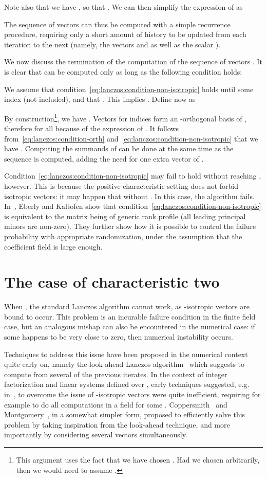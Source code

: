 Note also that we have ,
so that . We can
then simplify the expression of  as


The sequence of vectors  can thus be computed
with a simple recurrence procedure, requiring only a short amount of
history to be updated from each iteration to the next (namely, the
vectors  and  as well as the scalar ). 

We now discuss the termination of the computation of the sequence of
vectors . It is clear that  can be computed only
as long as the following condition holds:

We assume
that condition~\eqref{eq:lanczos:condition-non-isotropic} holds until
some index  (not included), and that . This implies
. Define now  as

By construction\footnote{This argument uses the fact that we have chosen
. Had we chosen  arbitrarily, then we would need to assume
.}, we have . Vectors  for indices 
form an -orthogonal basis of , therefore  for all
 because of the expression of . It follows from~\eqref{eq:lanczos:condition-orth}
and~\eqref{eq:lanczos:condition-non-isotropic} that we have .
Computing the summands of  can be done at the same
time as the sequence  is computed, adding the need for
one extra vector of .

Condition~\eqref{eq:lanczos:condition-non-isotropic} may fail to hold
without reaching  , however. This is because the positive characteristic
setting does not forbid -isotropic vectors: it may happen that
 without . In this case, the algorithm fails. In~\cite{EbKa97},
Eberly and Kaltofen show that
condition~\eqref{eq:lanczos:condition-non-isotropic} is equivalent to the
matrix  being of generic rank
profile (all leading principal minors are non-zero). They further show
how it is possible to control the failure probability with appropriate
randomization, under the assumption that the coefficient field is large
enough.

\section{The case of characteristic two}
\label{sec:blocklanczos:char2}
When , the standard Lanczos algorithm cannot work, as -isotropic
vectors are bound to occur.  This problem is an incurable failure
condition in the finite field case, but an analogous mishap can also be
encountered in the numerical case: if some  happens to be very
close to zero, then numerical instability occurs.

Techniques to address this issue have been proposed in the numerical
context quite early on, namely the look-ahead Lanczos
algorithm~\cite{PaTaLi85} which suggests to compute  from
several of the previous iterates.
In the context of integer factorization and
linear systems defined over , early techniques suggested, e.g.
in~\cite{C:LaMOdl90a}, to overcome the issue of -isotropic vectors
were quite inefficient, requiring for example to do all computations in
a field  for some .
Coppersmith~\cite{Coppersmith93a} and Montgomery~\cite{EC:Montgomery95},
in a somewhat simpler form, proposed to efficiently solve this problem by
taking inspiration from the look-ahead technique, and more importantly by
considering several vectors simultaneously.

